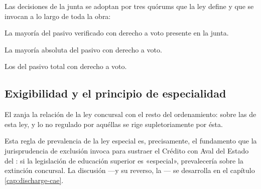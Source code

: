 Las decisiones de la junta se adoptan por tres quórums que la ley define y que se invocan a lo
largo de toda la obra:

\begin{description}[leftmargin=0pt,style=nextline,font=\sffamily\bfseries]
  \item[Quórum Simple] La mayoría del pasivo verificado con derecho a voto presente en la junta.
  \item[Quórum Calificado] La mayoría absoluta del pasivo con derecho a voto.
  \item[Quórum Especial] Los  del pasivo total con derecho a voto.
\end{description}

\subsection{Exigibilidad y el principio de especialidad}

El  zanja la relación de la ley concursal con el resto del ordenamiento:  sobre las de esta ley, y lo no regulado por aquéllas se
rige supletoriamente por ésta.

\begin{foco}
Esta regla de prevalencia de la ley especial es, precisamente, el fundamento que la
jurisprudencia de exclusión invoca para sustraer el Crédito con Aval del Estado del
\discharge{}: si la legislación de educación superior es «especial», prevalecería sobre la
extinción concursal. La discusión ---y su reverso, la --- se desarrolla en el
capítulo \ref{cap:discharge-cae}.
\end{foco}
